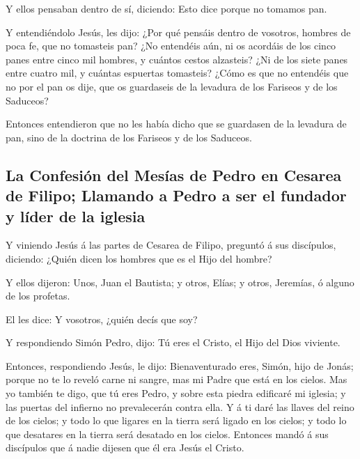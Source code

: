  Y ellos pensaban dentro de sí, diciendo: Esto dice porque
no tomamos pan.

 Y entendiéndolo Jesús, les dijo: ¿Por qué pensáis dentro
de vosotros, hombres de poca fe, que no tomasteis pan? 
¿No entendéis aún, ni os acordáis de los cinco panes entre cinco mil
hombres, y cuántos cestos alzasteis?  ¿Ni de los siete
panes entre cuatro mil, y cuántas espuertas tomasteis? 
¿Cómo es que no entendéis que no por el pan os dije, que os guardaseis
de la levadura de los Fariseos y de los Saduceos?

 Entonces entendieron que no les había dicho que se
guardasen de la levadura de pan, sino de la doctrina de los Fariseos y
de los Saduceos.

\hypertarget{la-confesiuxf3n-del-mesuxedas-de-pedro-en-cesarea-de-filipo-llamando-a-pedro-a-ser-el-fundador-y-luxedder-de-la-iglesia}{%
\subsection{La Confesión del Mesías de Pedro en Cesarea de Filipo;
Llamando a Pedro a ser el fundador y líder de la
iglesia}\label{la-confesiuxf3n-del-mesuxedas-de-pedro-en-cesarea-de-filipo-llamando-a-pedro-a-ser-el-fundador-y-luxedder-de-la-iglesia}}

 Y viniendo Jesús á las partes de Cesarea de Filipo,
preguntó á sus discípulos, diciendo: ¿Quién dicen los hombres que es el
Hijo del hombre?

 Y ellos dijeron: Unos, Juan el Bautista; y otros, Elías;
y otros, Jeremías, ó alguno de los profetas.

 El les dice: Y vosotros, ¿quién decís que soy?

 Y respondiendo Simón Pedro, dijo: Tú eres el Cristo, el
Hijo del Dios viviente.

 Entonces, respondiendo Jesús, le dijo: Bienaventurado
eres, Simón, hijo de Jonás; porque no te lo reveló carne ni sangre, mas
mi Padre que está en los cielos.  Mas yo también te digo,
que tú eres Pedro, y sobre esta piedra edificaré mi iglesia; y las
puertas del infierno no prevalecerán contra ella.  Y á ti
daré las llaves del reino de los cielos; y todo lo que ligares en la
tierra será ligado en los cielos; y todo lo que desatares en la tierra
será desatado en los cielos.  Entonces mandó á sus
discípulos que á nadie dijesen que él era Jesús el Cristo.

